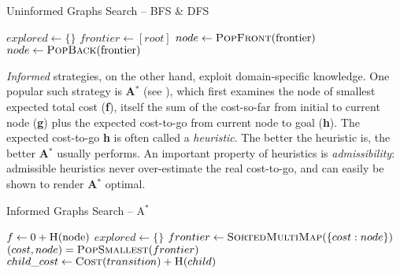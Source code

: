 \\
\\
\teal
\begin{algorithm}[H]
\caption{Uninformed Graphs Search -- BFS \& DFS}\label{alg:TheoryBFSDFS}
\begin{algorithmic}
\State{}
\EndIf
\State $explored \gets \{\}$
\State $frontier \gets [root]$
\State{}
 \EndIf
 \State $node \gets \Call{PopFront}{$frontier$}$
 \Else
 \State $node \gets \Call{PopBack}{$frontier$}$ \teal {} \black
 \EndIf
\State {}
\EndIf
\State {}
\EndFor
\EndWhile
\EndFunction
\end{algorithmic}
\end{algorithm}
\black
\noindent \textit{Informed} strategies, on the other hand, exploit domain-specific knowledge. One popular such strategy is \textbf{A$^{*}$} (see \cite{DBLP:journals/jacm/DechterP85}), which first examines the node of smallest expected total cost (\textbf{f}), itself the sum of the cost-so-far from initial to current node (\textbf{g}) plus the expected cost-to-go from current node to goal (\textbf{h}). The expected cost-to-go \textbf{h} is often called a \textit{heuristic}. The better the heuristic is, the better \textbf{A$^{*}$} usually performs. An important property of heuristics is \textit{admissibility}: admissible heuristics never over-estimate the real cost-to-go, and can easily be shown to render \textbf{A$^{*}$} optimal.
\teal
\begin{algorithm}[H]
\caption{Informed Graphs Search -- A$^{*}$}\label{alg:TheoryAStar}
\begin{algorithmic}
 \teal {} \black
\State{}
\State $f \gets 0 + \Call{H}{$node$}$
\State $explored \gets \{\}$
\State $frontier \gets \Call{SortedMultiMap}{\{cost: node\}}$
\State{}
 \EndIf
\State $(cost, node) = \Call{PopSmallest}{frontier}$
\EndIf
\State {}
	\State $child\_cost \gets \Call{Cost}{transition} + \Call{H}{child}$
             \\
             \ \ \ \ \ \ \ \ \ \ \ \ \ \ \ \ \ \ \ \ \ \ \ \ 
	\EndIf
\EndFor
\EndWhile
\EndFunction
\end{algorithmic}
\end{algorithm}
\black

